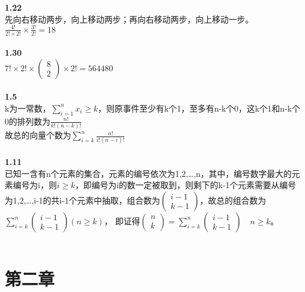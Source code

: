 \documentclass{book}%
\begin{document}
	{\bfseries 1.22}\\
	先向右移动两步，向上移动两步；再向右移动两步，向上移动一步。\\
	$\frac{4!}{2!\times 2!}\times \frac{3!}{2!}=18$\\
	~\\
	
	{\bfseries 1.30}\\
	$7!\times 2!\times \begin{pmatrix}
		8\\2
	\end{pmatrix}\times 2!=564480$\\
	~\\
	
	{\bfseries 1.5}\\
	k为一常数，$\sum_{i=1}^{n}x_{i}\ge k$，则原事件至少有k个1，至多有n-k个0，这k个1和n-k个0的排列数为$\frac{n!}{k!(n-k)!}$\\
	故总的向量个数为$\sum\limits_{i=k}^{n}\frac{n!}{i!(n-i)!}$\\
	~\\
	
	{\bfseries 1.11}\\
	已知一含有n个元素的集合，元素的编号依次为1,2,\dots ,n，其中，编号数字最大的元素编号为i，则$i\ge k$，即编号为i的数一定被取到，则剩下的k-1个元素需要从编号为1,2,\dots ,i-1的共i-1个元素中抽取，组合数为$\begin{pmatrix}
		i-1\\k-1
	\end{pmatrix}$，故总的组合数为$\sum\limits_{i=k}^{n}\begin{pmatrix}
		i-1\\k-1
	\end{pmatrix}(n\ge k)$，
	即证得$\begin{pmatrix}
		n\\k
	\end{pmatrix}=\sum\limits_{i=k}^{n}\begin{pmatrix}
		i-1\\k-1
	\end{pmatrix}\quad n\ge k$。\\
	~\\
	
	\chapter{第二章}
	
\end{document}
